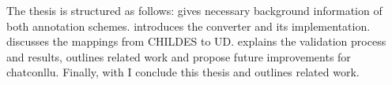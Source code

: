 The thesis is structured as follows:  gives necessary background information of both annotation schemes.  introduces the converter and its implementation.  discusses the mappings from CHILDES to UD.  explains the validation process and results, outlines related work and propose future improvements for chatconllu. Finally, with  I conclude this thesis and outlines related work.

